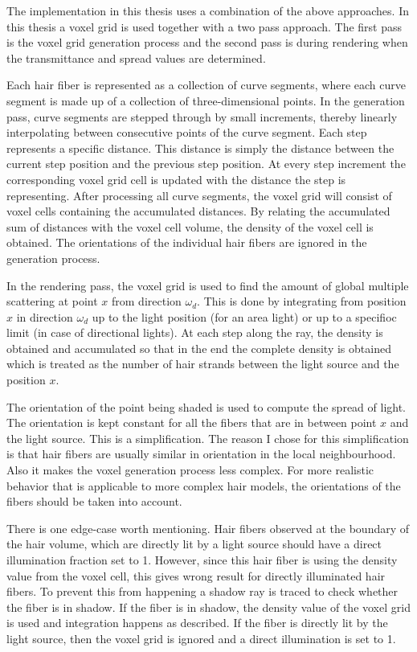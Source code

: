 \documentclass[11pt,a4paper]{report}
\begin{document}
The implementation in this thesis uses a combination of the above approaches. In this thesis a voxel grid is used together with a two pass approach. The first pass is the voxel grid generation process and the second pass is during rendering when the transmittance and spread values are determined. 

Each hair fiber is represented as a collection of curve segments, where each curve segment is made up of a collection of three-dimensional points. In the generation pass, curve segments are stepped through by small increments, thereby linearly interpolating between consecutive points of the curve segment. Each step represents a specific distance. This distance is simply the distance between the current step position and the previous step position. At every step increment the corresponding voxel grid cell is updated with the distance the step is representing. After processing all curve segments, the voxel grid will consist of voxel cells containing the accumulated distances. By relating the accumulated sum of distances with the voxel cell volume, the density of the voxel cell is obtained. The orientations of the individual hair fibers are ignored in the generation process. 

In the rendering pass, the voxel grid is used to find the amount of global multiple scattering at point $x$ from direction $\omega_d$. This is done by integrating from position $x$ in direction $\omega_d$ up to the light position (for an area light) or up to a specifioc limit (in case of directional lights). At each step along the ray, the density is obtained and accumulated so that in the end the complete density is obtained which is treated as the number of hair strands between the light source and the position $x$.

The orientation of the point being shaded is used to compute the spread of light. The orientation is kept constant for all the fibers that are in between point $x$ and the light source. This is a simplification. The reason I chose for this simplification is that hair fibers are usually similar in orientation in the local neighbourhood. Also it makes the voxel generation process less complex. For more realistic behavior that is applicable to more complex hair models, the orientations of the fibers should be taken into account.

There is one edge-case worth mentioning. Hair fibers observed at the boundary of the hair volume, which are directly lit by a light source should have a direct illumination fraction set to 1. However, since this hair fiber is using the density value from the voxel cell, this gives wrong result for directly illuminated hair fibers. To prevent this from happening a shadow ray is traced to check whether the fiber is in shadow. If the fiber is in shadow, the density value of the voxel grid is used and integration happens as described. If the fiber is directly lit by the light source, then the voxel grid is ignored and a direct illumination is set to 1.
\end{document}
